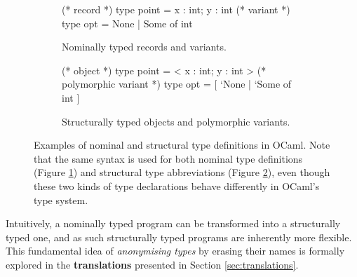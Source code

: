 \begin{figure}
    \centering
    \begin{subfigure}{.49\textwidth}
    \centering
    \begin{ocaml}
(* record *)
type point = { x : int; y : int }
(* variant *)
type opt = None | Some of int
    \end{ocaml}
    \caption{Nominally typed records and variants.}
    \label{subfig:nominal-ocaml}
    \end{subfigure}
    \hfill
    \begin{subfigure}{.49\textwidth}
    \centering
    \begin{ocaml}
(* object *)
type point = < x : int; y : int >
(* polymorphic variant *)
type opt = [ `None | `Some of int ]
    \end{ocaml}
    \caption{Structurally typed objects and polymorphic variants.}
    \label{subfig:structural-ocaml}
    \end{subfigure}
    \caption{Examples of nominal and structural type definitions in OCaml. Note that the same syntax is used for both nominal type definitions (Figure \ref{subfig:nominal-ocaml}) and structural type abbreviations (Figure \ref{subfig:structural-ocaml}), even though these two kinds of type declarations behave differently in OCaml's type system.}
    \label{fig:nominal-and-structural-ocaml}
\end{figure}

Intuitively, a nominally typed program can be transformed into a structurally typed one, and as such structurally typed programs are inherently more flexible. 
This fundamental idea of \emph{anonymising types} by erasing their names is formally explored in the \textbf{translations} presented in Section \ref{sec:translations}.

